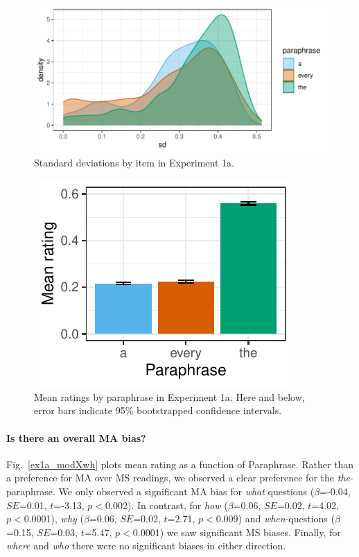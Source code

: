 \documentclass[12pt,letterpaper,table,svgnames,dvipsnames]{article}
\newcommand{\figref}[1]{Fig.~\ref{#1}}
\begin{document}
\begin{figure}[h!]
\centering
\includegraphics[scale=.8]{figures/ex1a_denisty_sd.pdf}
\caption{Standard deviations by item in Experiment 1a.}
\label{ex1a_density_sd}
\end{figure}

\begin{figure}[h!]
\centering
\centering
\includegraphics[scale=1]{figures/overall_rq_context.pdf}
\caption{Mean ratings by paraphrase in Experiment 1a. Here and below, error bars indicate 95\% bootstrapped confidence intervals.}
\label{ex1a_overall}
\end{figure}


\paragraph{Is there an overall MA bias?} 
\figref{ex1a_modXwh} plots mean rating as a function of Paraphrase. Rather than a preference for MA over MS readings, we observed a clear preference for the \emph{the}-paraphrase. We only observed a significant MA bias for \emph{what} questions ($\beta$=-0.04, $SE$=0.01, $t$=-3.13, $p<$0.002). In contrast, for \emph{how} ($\beta$=0.06, $SE$=0.02, $t$=4.02, $p<$0.0001), \emph{why} ($\beta$=0.06, $SE$=0.02, $t$=2.71, $p<$0.009) and \emph{when}-questions ($\beta$=0.15, $SE$=0.03, $t$=5.47, $p<$0.0001) we saw significant MS biases. Finally, for \emph{where} and \emph{who} there were no significant biases in either direction. 
\end{document}

